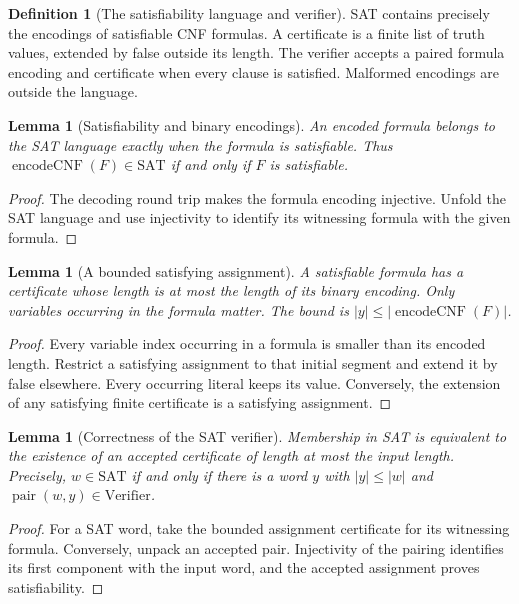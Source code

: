 \documentclass[11pt]{article}
\newtheorem{lemma}[theorem]{Lemma}
\theoremstyle{definition}
\newtheorem{definition}[theorem]{Definition}
\begin{document}
\begin{definition}[The satisfiability language and verifier]\leavevmode
SAT contains precisely the encodings of satisfiable CNF formulas.
A certificate is a finite list of truth values, extended by false outside
its length. The verifier accepts a paired formula encoding and certificate
when every clause is satisfied. Malformed encodings are outside the language.

\end{definition}

\begin{lemma}[Satisfiability and binary encodings]\leavevmode
An encoded formula belongs to the SAT language exactly when the formula is satisfiable.
Thus $\operatorname{encodeCNF}(F)\in\mathrm{SAT}$ if and only if $F$ is satisfiable.
\end{lemma}
\begin{proof}\leavevmode
The decoding round trip makes the formula encoding injective. Unfold the SAT language and use injectivity to identify its witnessing formula with the given formula.\qedhere
\end{proof}

\begin{lemma}[A bounded satisfying assignment]\leavevmode
A satisfiable formula has a certificate whose length is at most the length
of its binary encoding. Only variables occurring in the formula matter.
The bound is $|y|\leq |\operatorname{encodeCNF}(F)|$.
\end{lemma}
\begin{proof}\leavevmode
Every variable index occurring in a formula is smaller than its encoded length. Restrict a satisfying assignment to that initial segment and extend it by false elsewhere. Every occurring literal keeps its value. Conversely, the extension of any satisfying finite certificate is a satisfying assignment.\qedhere
\end{proof}

\begin{lemma}[Correctness of the SAT verifier]\leavevmode
Membership in SAT is equivalent to the existence of an accepted certificate
of length at most the input length.
Precisely, $w\in\mathrm{SAT}$ if and only if there is a word $y$ with $|y|\leq|w|$ and $\operatorname{pair}(w,y)\in\mathrm{Verifier}$.
\end{lemma}
\begin{proof}\leavevmode
For a SAT word, take the bounded assignment certificate for its witnessing formula. Conversely, unpack an accepted pair. Injectivity of the pairing identifies its first component with the input word, and the accepted assignment proves satisfiability.\qedhere
\end{proof}
\end{document}
